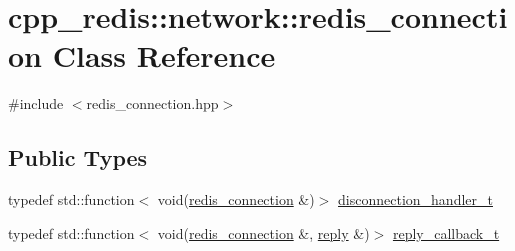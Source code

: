 \hypertarget{classcpp__redis_1_1network_1_1redis__connection}{}\section{cpp\+\_\+redis\+:\+:network\+:\+:redis\+\_\+connection Class Reference}
\label{classcpp__redis_1_1network_1_1redis__connection}


{\ttfamily \#include $<$redis\+\_\+connection.\+hpp$>$}

\subsection*{Public Types}
\begin{DoxyCompactItemize}
\item 
typedef std\+::function$<$ void(\hyperlink{classcpp__redis_1_1network_1_1redis__connection}{redis\+\_\+connection} \&)$>$ \hyperlink{classcpp__redis_1_1network_1_1redis__connection_aba1a229a3d36a5540a80776ed0cf9a44}{disconnection\+\_\+handler\+\_\+t}
\item 
typedef std\+::function$<$ void(\hyperlink{classcpp__redis_1_1network_1_1redis__connection}{redis\+\_\+connection} \&, \hyperlink{classcpp__redis_1_1reply}{reply} \&)$>$ \hyperlink{classcpp__redis_1_1network_1_1redis__connection_a40f4b55a3103b7436e34211893377245}{reply\+\_\+callback\+\_\+t}
\end{DoxyCompactItemize}

